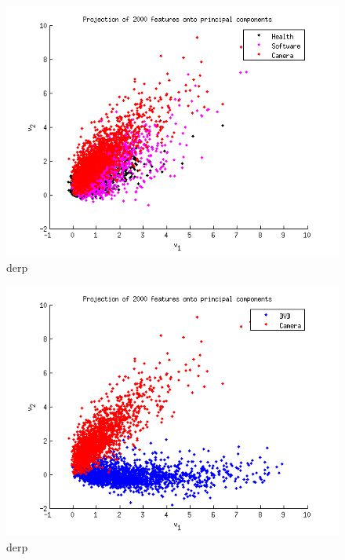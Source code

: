 \begin{figure}[H]
\centering
\includegraphics[scale = 0.5]{../Plottar/pca_largecorr.png}
\caption{derp}
\label{fig:trainingsize}
\end{figure} 

\begin{figure}[H]
\centering
\includegraphics[scale = 0.5]{../Plottar/pca_nocorr.png}
\caption{derp}
\label{fig:trainingsize}
\end{figure} 

